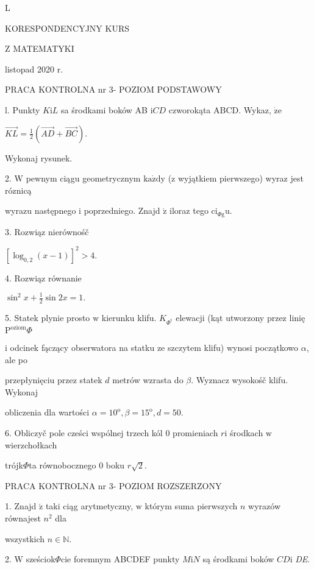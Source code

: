 \documentclass[a4paper,12pt]{article}
\begin{document}
L

KORESPONDENCYJNY KURS

Z MATEMATYKI

listopad 2020 r.

PRACA KONTROLNA nr 3- POZIOM PODSTAWOWY

l. Punkty $K\mathrm{i}L$ sa środkami boków AB $\mathrm{i}CD$ czworokąta ABCD. Wykaz, $\dot{\mathrm{z}}\mathrm{e}$

$\displaystyle \vec{KL}=\frac{1}{2}(\vec{AD}+\vec{BC}).$

Wykonaj rysunek.

2. $\mathrm{W}$ pewnym ciągu geometrycznym $\mathrm{k}\mathrm{a}\dot{\mathrm{z}}\mathrm{d}\mathrm{y}$ ($\mathrm{z}$ wyjątkiem pierwszego) wyraz jest róznicą

wyrazu następnego $\mathrm{i}$ poprzedniego. Znajd $\acute{\mathrm{z}}$ iloraz tego $\mathrm{c}\mathrm{i}_{\Phi \mathrm{g}}\mathrm{u}.$

3. Rozwiąz nierównośč

$[\log_{0,2}(x-1)]^{2}>4.$

4. Rozwiąz równanie

$\displaystyle \sin^{2}x+\frac{1}{2}\sin 2x=1.$

5. Statek plynie prosto $\mathrm{w}$ kierunku klifu. $K_{\Phi^{\mathrm{t}}}$ elewacji (kąt utworzony przez linię $\mathrm{P}^{\mathrm{o}\mathrm{z}\mathrm{i}\mathrm{o}\mathrm{m}}\Phi$

$\mathrm{i}$ odcinek fączący obserwatora na statku ze szczytem klifu) wynosi początkowo $\alpha$, ale po

przepłynięciu przez statek $d$ metrów wzrasta do $\beta$. Wyznacz wysokośč klifu. Wykonaj

obliczenia dla wartości $\alpha=10^{\mathrm{o}}, \beta=15^{\mathrm{o}}, d=50.$

6. Obliczyč pole cześci wspólnej trzech kól $0$ promieniach $r \mathrm{i}$ środkach $\mathrm{w}$ wierzchołkach

trójk$\Phi$ta równobocznego $0$ boku $r\sqrt{2}.$




PRACA KONTROLNA nr 3- POZIOM ROZSZERZONY

1. Znajd $\acute{\mathrm{z}}$ taki ciąg arytmetyczny, $\mathrm{w}$ którym suma pierwszych $n$ wyrazów równajest $n^{2}$ dla

wszystkich $n\in \mathbb{N}.$

2. $\mathrm{W}$ sześciok$\Phi$cie foremnym ABCDEF punkty $M \mathrm{i} N$ są środkami boków $CD \mathrm{i}$ {\it DE}.
\end{document}
